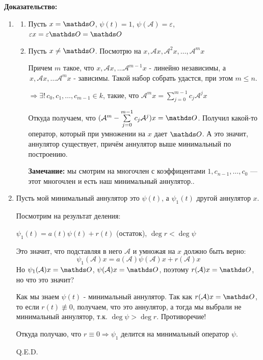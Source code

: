 \textbf{Доказательство:}
\begin{enumerate}
    \item
    \begin{enumerate}
       \item Пусть $x = \zero$, $\psi(t)=1$, $\psi(\mathcal{A})=\varepsilon$,  $\varepsilon x=\varepsilon \zero = \zero$

        \item Пусть $x \ne \zero$. Посмотрю на $x, \mathcal{A}x,\mathcal{A}^2x,\ldots,\mathcal{A}^mx$

       Причем $m$ такое, что $x, \mathcal{A}x, \ldots \mathcal{A}^{m-1}x$ - линейно независимы, а $\, x, \mathcal{A}x, \ldots \mathcal{A}^{m}x$ - зависимы. Такой набор собрать удастся, при этом $m \le n$.

    $\Rightarrow  \exists! \, c_0,c_1,\ldots,c_{m-1} \in k$, такие, что $\mathcal{A}^mx = \sum\limits_{j=0}^{m-1}c_j\mathcal{A}^jx$

     Откуда получаем, что  $(\mathcal{A}^m- \sum\limits_{j=0}^{m-1}c_j\mathcal{A}^j)x= \zero$. Получил какой-то оператор, который при умножении на $x$ дает $\zero$. А это значит, аннулятор существует, причём аннулятор выше минимальный по построению.

     \textbf{Замечание:} мы смотрим на многочлен с коэффицентами $1,c_{n-1},\ldots, c_0$ --- этот многочлен и есть наш минимальный аннулятор..

    \end{enumerate}
    \item Пусть мой минимальный аннулятор это $\psi(t)$, а $\psi_1(t)$ другой аннулятор $x$.

    Посмотрим на результат деления:

    $\psi_1(t)=a(t) \psi(t) + r(t)$ (остаток), $\deg r < \deg \psi$

    Это значит, что подставляя в него $\mathcal{A}$ и умножая на $x$ должно быть верно:
    $$\psi_1(\mathcal{A})x = a(\mathcal{A})\psi(\mathcal{A})x+r(\mathcal{A})x$$
    Но $\psi_1(\mathcal{A})x = \zero$, $\psi(\mathcal{A})x = \zero$, поэтому $  r(\mathcal{A})x= \zero$, но что это значит?

    Как мы знаем $\psi(t)$ - минимальный аннулятор. Так как $r(\mathcal{A})x = \zero$, то если $r(t)\not \equiv 0$, получаем, что это аннулятор, а тогда мы выбрали не минимальный аннулятор, т.к. $\deg \psi> \deg r$. Противоречие!

    Откуда получаю, что $r\equiv0 \Rightarrow  \psi_1$ делится на минимальный оператор $\psi$.

    \hfill Q.E.D.

\end{enumerate}



